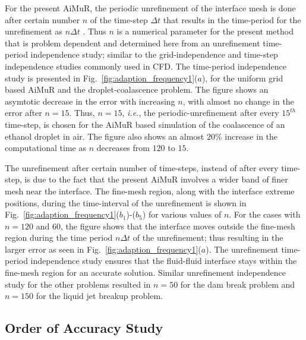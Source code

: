 \documentclass[preprint,12pt]{elsarticle}
\begin{document}
{\begin{figure}
\end{figure}

For the present AiMuR, the periodic unrefinement of the interface mesh is done after certain number $n$  of the time-step $\Delta t$  that results in the time-period for the unrefinement as $n\Delta t$ . Thus  $n$  is a numerical parameter for the present method that is problem dependent and determined here from an unrefinement time-period independence study; similar to the grid-independence and time-step independence studies commonly used in CFD. The time-period independence study is presented in Fig.~\ref{fig:adaption_frequency1}($a$), for the uniform grid based AiMuR and the droplet-coalascence problem. The figure shows an asymtotic decrease in the error with increasing $n$, with almost no change in the error after $n=15$. Thus, $n=15$, \emph{i.e.}, the periodic-unrefinement after every $15^{th}$  time-step, is chosen for the AiMuR based simulation of the coalascence of an ethanol droplet in air. The figure also shows an almost $20\%$  increase in the computational time as $n$  decreases from $120$  to $15$.

The unrefinement after certain number of time-steps, instead of after every time-step, is due to the fact that the present AiMuR involves a wider band of finer mesh near the interface. The fine-mesh region, along with the interface extreme positions, during the time-interval of the unrefinement is shown in Fig.~\ref{fig:adaption_frequency1}($b_{1}$)-($b_{5}$) for various values of $n$. For the cases with $n=120$ and $60$, the figure shows that the interface moves outside the fine-mesh region during the time period $n\Delta t$  of the unrefinement; thus resulting in the larger error as seen in Fig.~\ref{fig:adaption_frequency1}($a$). The unrefinement time-period independence study ensures that the fluid-fluid interface stays within the fine-mesh region for an accurate solution. Similar unrefinement independence study for the other problems resulted in $n=50$ for the dam break problem and $n=150$ for the liquid jet breakup problem.


\subsection{Order of Accuracy Study}\label{sub:Order}


}
\end{document}
